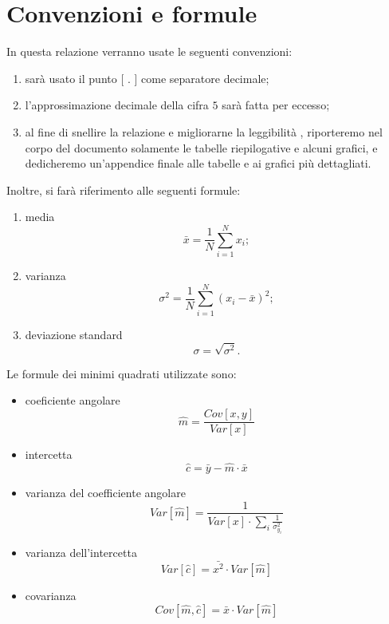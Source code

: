 \documentclass[10pt,oneside,a4paper]{article}
\begin{document}
\section{Convenzioni e formule}
In questa relazione verranno usate le seguenti convenzioni:
\begin{enumerate}
	\item sarà usato il punto [ $.$ ] come separatore decimale;
	\item l'approssimazione decimale della cifra $5$ sarà fatta per eccesso;
	\item al fine di snellire la relazione e migliorarne la leggibilità , riporteremo nel corpo del documento solamente le tabelle riepilogative e alcuni grafici, e dedicheremo un'appendice finale alle tabelle e ai grafici più dettagliati.
\end{enumerate}
Inoltre, si farà riferimento alle seguenti formule:
\begin{enumerate}
	\item media 
	\begin{equation}\label{eq:media}
	\bar{x} = \frac{1}{N}\sum_{i=1}^Nx_i;
	\end{equation}
	\item varianza
	\begin{equation}\label{eq:varianza}
	\sigma^2 = \frac{1}{N}\sum_{i=1}^N(x_i-\bar{x})^2;
	\end{equation}
	\item deviazione standard
	\begin{equation}\label{eq:deviazione}
	\sigma = \sqrt{\sigma^2}.
	\end{equation}	
\end{enumerate}
Le formule dei minimi quadrati utilizzate sono: 
\begin{itemize}
	\item coeficiente angolare
	\begin{equation}\label{eq:coeficienteangolare}
	\hat{m} = \frac{Cov[x,y]}{Var[x]}
	\end{equation}
	\item intercetta
	\begin{equation}\label{eq:intercetta}
	\hat{c} = \bar{y} - \hat{m} \cdot \bar{x}
	\end{equation}
	\item varianza del coefficiente angolare
	\begin{equation}\label{eq:varianzacoeff}
	Var[\hat{m}] = \frac{1}{Var[x]\cdot \sum_{i}\frac{1}{\sigma_{y_i}^2}}
	\end{equation}
	\item varianza dell'intercetta 
	\begin{equation}\label{eq:varianzainter}
	Var[\hat{c}] = \bar{x^2}\cdot Var[\hat{m}]
	\end{equation}
	\item covarianza 
	\begin{equation}\label{eq:cov}
	Cov[\hat{m}, \hat{c}] = \bar{x} \cdot Var[\hat{m}]
	\end{equation}
\end{itemize}
\end{document}
